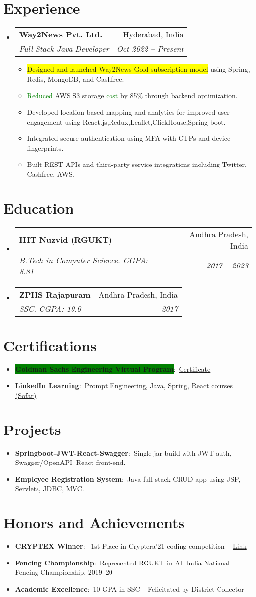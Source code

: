 \documentclass[a4paper,11pt]{article}
\makeatletter
\newcommand{\resumeItem}[2]{\item \small{\textbf{#1}:~#2}}
\newcommand{\resumeSubheading}[4]{
  \item
    \begin{tabular*}{0.97\textwidth}{l@{\extracolsep{\fill}}r}
      \textbf{#1} & #2 \\
      \textit{#3} & \textit{#4} \\
    \end{tabular*}
}
\newcommand{\resumeSubHeadingListStart}{\begin{itemize}[leftmargin=*]}
\newcommand{\resumeSubHeadingListEnd}{\end{itemize}}
\newcommand{\resumeItemListStart}{\begin{itemize}}
\newcommand{\resumeItemListEnd}{\end{itemize}}
\makeatother
\begin{document}
\section{Experience}
\resumeSubHeadingListStart
\resumeSubheading{Way2News Pvt. Ltd.}{Hyderabad, India}{Full Stack Java Developer}{Oct 2022 – Present}
\resumeItemListStart
\item \colorbox{Yellow}{Designed and launched Way2News Gold subscription model} using Spring, Redis, MongoDB, and Cashfree.
\item \textcolor{Green}{Reduced} AWS S3 storage \textcolor{Green}{cost} by 85\% through backend optimization.
\item Developed location-based mapping and analytics for improved user engagement using React.js,Redux,Leaflet,ClickHouse,Spring boot.
\item Integrated secure authentication using MFA with OTPs and device fingerprints.
\item Built REST APIs and third-party service integrations including Twitter, Cashfree, AWS.

\resumeItemListEnd
\resumeSubHeadingListEnd

\section{Education}
\resumeSubHeadingListStart
\resumeSubheading{IIIT Nuzvid (RGUKT)}{Andhra Pradesh, India}{B.Tech in Computer Science. CGPA: 8.81}{2017 – 2023}
\resumeSubheading{ZPHS Rajapuram}{Andhra Pradesh, India}{SSC. CGPA: 10.0}{2017}
\resumeSubHeadingListEnd

\section{Certifications}
\resumeSubHeadingListStart
\resumeItem{\colorbox{Green}{Goldman Sachs Engineering Virtual Program}}{\href{https://drive.google.com/file/d/1pOMqlvICYjv8Lg3paqGChd0rFX17uZNx/view?usp=sharing}{Certificate}}
\resumeItem{LinkedIn Learning}{\href{https://drive.google.com/drive/u/1/folders/1enkCm1m-Dm60tNfOQTiLahdnopH1zJEw}{Prompt Engineering, Java, Spring, React courses (Sofar)}}
\resumeSubHeadingListEnd

\section{Projects}
\resumeSubHeadingListStart
\resumeItem{Springboot-JWT-React-Swagger}{Single jar build with JWT auth, Swagger/OpenAPI, React front-end.}
\resumeItem{Employee Registration System}{Java full-stack CRUD app using JSP, Servlets, JDBC, MVC.}
\resumeSubHeadingListEnd

\section{Honors and Achievements}
\resumeSubHeadingListStart
\resumeItem{CRYPTEX Winner}{
  1st Place in Cryptera'21 coding competition – 
  \href{https://www.instagram.com/p/CT4NXFlqCkF/?igsh=ZXhnOXBnb2ZoczE\%3D\&img_index=3}{Link}
}
\resumeItem{Fencing Championship}{Represented RGUKT in All India National Fencing Championship, 2019–20}
\resumeItem{Academic Excellence}{10 GPA in SSC – Felicitated by District Collector}
\resumeSubHeadingListEnd
\end{document}
